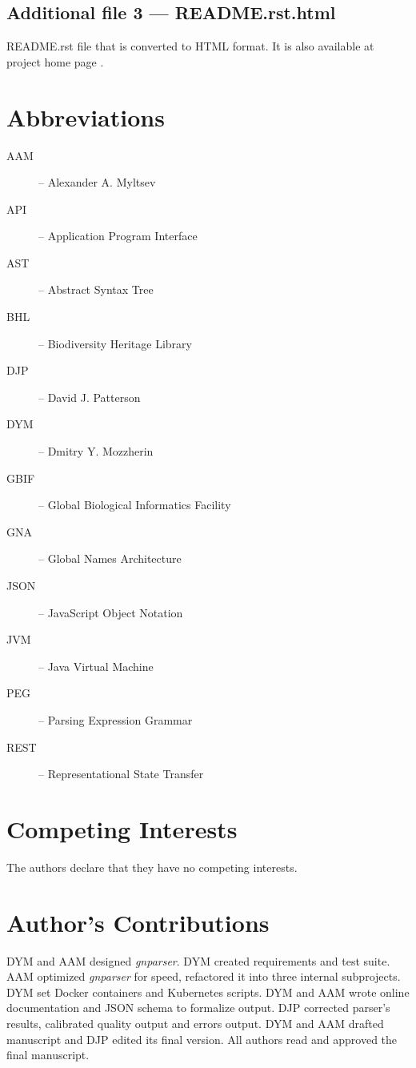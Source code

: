 \documentclass{bmcart}
\begin{document}
  \subsection*{Additional file 3 --- README.rst.html}
  README.rst file that is converted to HTML format. It is also available at
  project home page \cite{gnparser}.

\section*{Abbreviations}

\begin{description}
  \item[AAM] -- Alexander A. Myltsev
  \item[API] -- Application Program Interface
  \item[AST] -- Abstract Syntax Tree
  \item[BHL] -- Biodiversity Heritage Library
  \item[DJP] -- David J. Patterson
  \item[DYM] -- Dmitry Y. Mozzherin
  \item[GBIF] -- Global Biological Informatics Facility
  \item[GNA] -- Global Names Architecture
  \item[JSON] -- JavaScript Object Notation
  \item[JVM] -- Java Virtual Machine
  \item[PEG] -- Parsing Expression Grammar
  \item[REST] -- Representational State Transfer
\end{description}

\section*{Competing Interests}

The authors declare that they have no competing interests.

\section*{Author's Contributions}

DYM and AAM designed \textit{gnparser}. DYM created requirements and test
suite. AAM optimized \textit{gnparser} for speed, refactored it into three
internal subprojects. DYM set Docker containers and Kubernetes scripts. DYM
and AAM wrote online documentation and JSON schema to formalize output. DJP
corrected parser's results, calibrated quality output and errors output. DYM
and AAM drafted manuscript and DJP edited its final version. All authors read
and approved the final manuscript.
\end{document}
